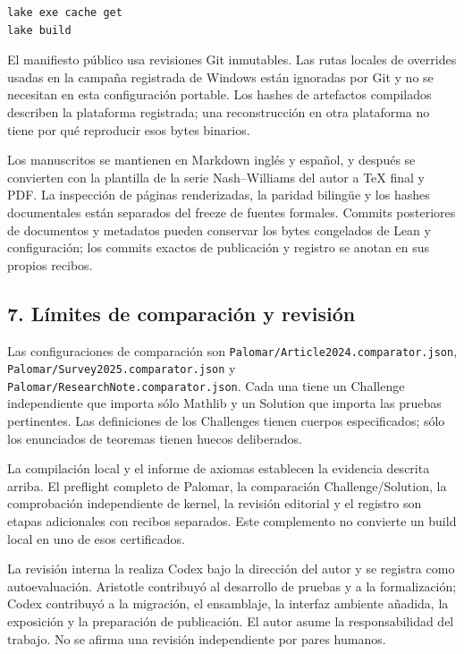 \documentclass[spanish,11pt,a4paper]{article}
\begin{document}
\begin{verbatim}
lake exe cache get
lake build
\end{verbatim}

El manifiesto público usa revisiones Git inmutables. Las rutas locales de overrides usadas en la campaña registrada de Windows están ignoradas por Git y no se necesitan en esta configuración portable. Los hashes de artefactos compilados describen la plataforma registrada; una reconstrucción en otra plataforma no tiene por qué reproducir esos bytes binarios.

Los manuscritos se mantienen en Markdown inglés y español, y después se convierten con la plantilla de la serie Nash--Williams del autor a TeX final y PDF. La inspección de páginas renderizadas, la paridad bilingüe y los hashes documentales están separados del freeze de fuentes formales. Commits posteriores de documentos y metadatos pueden conservar los bytes congelados de Lean y configuración; los commits exactos de publicación y registro se anotan en sus propios recibos.

\subsection{7. Límites de comparación y revisión}\label{luxedmites-de-comparaciuxf3n-y-revisiuxf3n}

Las configuraciones de comparación son \texttt{Palomar/\allowbreak{}Article2024.\allowbreak{}comparator.\allowbreak{}json}, \texttt{Palomar/\allowbreak{}Survey2025.\allowbreak{}comparator.\allowbreak{}json} y \texttt{Palomar/\allowbreak{}Research\allowbreak{}Note.\allowbreak{}comparator.\allowbreak{}json}. Cada una tiene un Challenge independiente que importa sólo Mathlib y un Solution que importa las pruebas pertinentes. Las definiciones de los Challenges tienen cuerpos especificados; sólo los enunciados de teoremas tienen huecos deliberados.

La compilación local y el informe de axiomas establecen la evidencia descrita arriba. El preflight completo de Palomar, la comparación Challenge/Solution, la comprobación independiente de kernel, la revisión editorial y el registro son etapas adicionales con recibos separados. Este complemento no convierte un build local en uno de esos certificados.

La revisión interna la realiza Codex bajo la dirección del autor y se registra como autoevaluación. Aristotle contribuyó al desarrollo de pruebas y a la formalización; Codex contribuyó a la migración, el ensamblaje, la interfaz ambiente añadida, la exposición y la preparación de publicación. El autor asume la responsabilidad del trabajo. No se afirma una revisión independiente por pares humanos.
\end{document}
